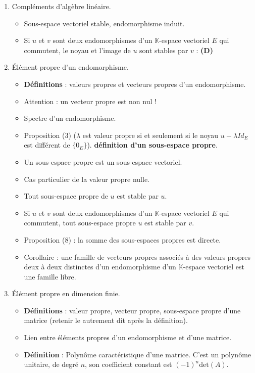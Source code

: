 \documentclass[twoside,a4paper,french,10pt]{VcCours}
\begin{document}
\begin{enumerate}
\item Compléments d'algèbre linéaire.
\begin{itemize}
\item Sous-espace vectoriel stable, endomorphisme induit.
\item Si $u$ et $v$ sont deux endomorphismes d'un $\mathbb{K}$-espace vectoriel $E$ qui commutent, le noyau et l'image de $u$ sont stables par $v$ : \textbf{(D)}
\end{itemize}
\item Élément propre d'un endomorphisme.
\begin{itemize}
\item \textbf{Définitions} : valeurs propres et vecteurs propres d'un endomorphisme.
\item Attention : un vecteur propre est non nul ! 
\item Spectre d'un endomorphisme.
\item Proposition (3) ($\lambda$ est valeur propre si et seulement si le noyau $u- \lambda Id_E$ est différent de $\lbrace 0_E \rbrace$). \textbf{définition d'un sous-espace propre}.
\item Un sous-espace propre est un sous-espace vectoriel.
\item Cas particulier de la valeur propre nulle.
\item Tout sous-espace propre de $u$ est stable par $u$. 
\item Si $u$ et $v$ sont deux endomorphismes d'un $\mathbb{K}$-espace vectoriel $E$ qui commutent, tout sous-espace propre $u$ est stable par $v$.
\item Proposition (8) : la somme des sous-espaces propres est directe.%
\item Corollaire : une famille de vecteurs propres associés à des valeurs propres deux à deux distinctes d'un endomorphisme d'un $\mathbb{K}$-espace vectoriel est une famille libre.
\end{itemize}
\item Élément propre en dimension finie.
\begin{itemize}
\item \textbf{Définitions} : valeur propre, vecteur propre, sous-espace propre d'une matrice (retenir le \og autrement dit \fg après la définition).
\item Lien entre éléments propres d'un endomorphisme et d'une matrice.
\item \textbf{Définition} : Polynôme caractéristique d'une matrice. C'est un polynôme unitaire, de degré $n$, son coefficient constant est $(-1)^n \textrm{det}(A)$.

\end{itemize}
\end{enumerate}
\end{document}

